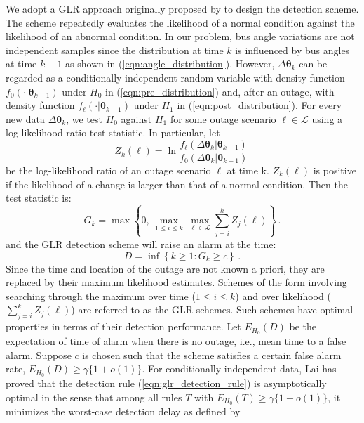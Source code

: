 We adopt a GLR approach originally proposed by \cite{lorden1971procedures} to design the detection scheme. The scheme repeatedly evaluates the likelihood of a normal condition against the likelihood of an abnormal condition. In our problem, bus angle variations are not independent samples since the distribution at time $k$ is influenced by bus angles at time $k-1$ as shown in (\ref{eqn:angle_distribution}). However, $\Delta\boldsymbol{\theta}_k$ can be regarded as a conditionally independent random variable with density function $f_0(\cdot | \boldsymbol{\theta}_{k-1})$ under $H_0$ in (\ref{eqn:pre_distribution}) and, after an outage, with density function $f_{\ell}(\cdot | \boldsymbol{\theta}_{k-1})$ under $H_1$ in (\ref{eqn:post_distribution}). For every new data $\Delta\boldsymbol{\theta}_k$, we test $H_0$ against $H_1$ for some outage scenario $\ell \in \mathcal{L}$ using a log-likelihood ratio test statistic. In particular, let 
\begin{equation}
\label{eqn:log_likelihood_ratio}
Z_k(\ell) = \ln \frac{f_{\ell}(\Delta\boldsymbol{\theta}_{k} | \boldsymbol{\theta}_{k-1})}{f_{0}(\Delta\boldsymbol{\theta}_{k} | \boldsymbol{\theta}_{k-1})} \,
\end{equation} be the log-likelihood ratio of an outage scenario $\ell$ at time k. $Z_k(\ell)$ is positive if the likelihood of a change is larger than that of a normal condition. Then the test statistic is:
\begin{equation}
\label{eqn:glr_statistic_direct}
G_k = \max \left\lbrace  0, \, \underset{1\le i \le k}{\max} \, \underset{\ell \in \mathcal{L}}{\max} \sum_{j=i}^{k} Z_{j}(\ell)  \right\rbrace\,.
\end{equation}
and the GLR detection scheme will raise an alarm at the time:
\begin{equation}
\label{eqn:glr_detection_rule}
D = \inf \left\lbrace  k \ge 1: G_k \ge c \right\rbrace \,.
\end{equation}
Since the time and location of the outage are not known a priori, they are replaced by their maximum likelihood estimates. Schemes of the form involving searching through the maximum over time ($1\le i \le k$) and over likelihood ($\sum_{j=i}^{k} Z_{j}(\ell)$) are referred to as the GLR schemes. Such schemes have optimal properties in terms of their detection performance. Let $E_{H_0}(D)$ be the expectation of time of alarm when there is no outage, i.e., mean time to a false alarm. Suppose $c$ is chosen such that the scheme satisfies a certain false alarm rate, $E_{H_0}(D) \ge \gamma\{ 1 + o(1) \}$. For conditionally independent data, Lai has proved that the detection rule (\ref{eqn:glr_detection_rule}) is asymptotically optimal in the sense that among all rules \(T\) with \(E_{H_0}(T) \geq \gamma\{ 1 + o(1)\}\), it minimizes the worst-case detection delay as defined by
